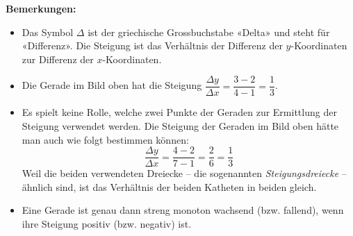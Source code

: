 \newpage
\textbf{Bemerkungen:}
\begin{itemize}
    \item Das Symbol $\Delta$ ist der griechische Grossbuchstabe «Delta» und steht für «Differenz». Die Steigung ist das Verhältnis der Differenz der $y$-Koordinaten zur Differenz der $x$-Koordinaten.
    \item Die Gerade im Bild oben hat die Steigung $\dfrac{\Delta y}{\Delta x} = \dfrac{3 - 2}{4 - 1} = \dfrac{1}{3}$.
    \item \begin{minipage}[t]{0.5\linewidth}
              Es spielt keine Rolle, welche zwei Punkte der Geraden zur Ermittlung der Steigung verwendet werden. Die Steigung der Geraden im Bild oben hätte man auch wie folgt bestimmen können:
              \[\frac{\Delta y}{\Delta x} = \frac{4 - 2}{7 - 1} = \frac{2}{6} = \frac{1}{3}\]
              Weil die beiden verwendeten Dreiecke -- die sogenannten \textit{Steigungsdreiecke} -- ähnlich sind, ist das Verhältnis der beiden Katheten in beiden gleich.
          \end{minipage}\hfill
          \begin{minipage}[t]{0.46\linewidth}
              \vspace{0pt}
          \end{minipage}
          \bigskip

    \item \begin{minipage}[t]{0.5\linewidth}
              Eine Gerade ist genau dann streng monoton wachsend (bzw. fallend), wenn ihre Steigung positiv (bzw. negativ) ist.


\end{minipage}
\end{itemize}
